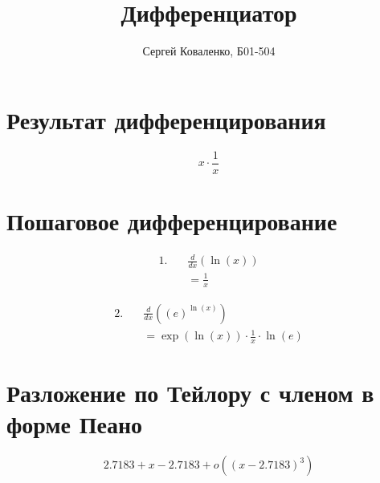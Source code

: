 \documentclass[a4paper,12pt]{article}
\title{Дифференциатор}
\author{Сергей Коваленко, Б01-504}
\begin{document}
\maketitle

\newpage

\section{Результат дифференцирования}

\[
{x}\cdot{\frac{1}{x}}
\]

\section{Пошаговое дифференцирование}

\[
\begin{aligned}
1.\quad &\frac{d}{dx}\left(\ln\left(x\right)\right) \\
&= \frac{1}{x}
\end{aligned}
\]

\[
\begin{aligned}
2.\quad &\frac{d}{dx}\left(\left(e\right)^{\ln\left(x\right)}\right) \\
&= {\exp\left(\ln\left(x\right)\right)}\cdot{{\frac{1}{x}}\cdot{\ln\left(e\right)}}
\end{aligned}
\]

\section{Разложение по Тейлору с членом в форме Пеано}
\[
{{2.7183 + {x - 2.7183}} + o\left((x - 2.7183)^{3}\right)}
\]
\end{document}
